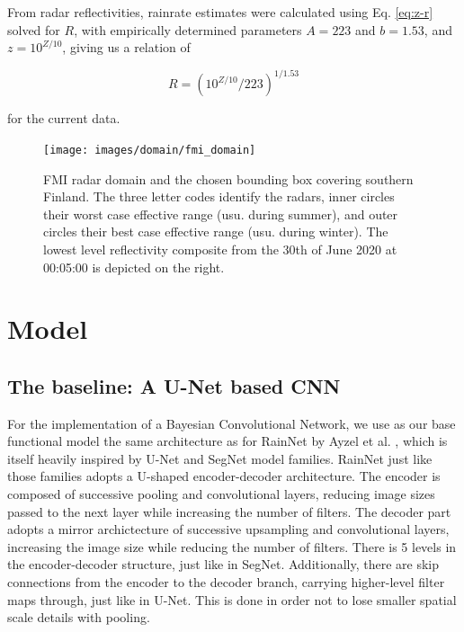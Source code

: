 



From radar reflectivities, rainrate estimates were calculated using Eq. \ref{eq:z-r} solved for $R$, with empirically determined parameters $A=223$ and $b=1.53$, and $z = 10^{Z / 10}$, giving us a relation of

\begin{equation}
\label{eq:dbz_to_r}
R = (10^{Z / 10} / 223)^{1/1.53}
\end{equation}

for the current data. 

\begin{figure}
	\centering
	\texttt{[image: images/domain/fmi\_domain]}
	\caption{FMI radar domain and the chosen bounding box covering southern Finland. The three letter codes identify the radars, inner circles their worst case effective range (usu. during summer), and outer circles their best case effective range (usu. during winter). The lowest level reflectivity composite from the 30th of June 2020 at 00:05:00 is depicted on the right.}
	\label{fig:domain}
\end{figure} 


\section{Model}

\subsection{The baseline: A U-Net based CNN}
\label{section:rainnet}

For the implementation of a Bayesian Convolutional Network, we use as our base functional model  the same architecture as for RainNet by Ayzel et al. \cite{ayzel_rainnet_nodate}, which is itself heavily inspired by U-Net and SegNet model families. RainNet just like those families adopts a U-shaped encoder-decoder architecture. The encoder is composed of successive pooling and convolutional layers, reducing image sizes passed to the next layer while increasing the number of filters. The decoder part adopts a mirror archictecture of successive upsampling and convolutional layers, increasing the image size while reducing the number of filters. There is 5 levels in the encoder-decoder structure, just like in SegNet. Additionally, there are skip connections from the encoder to the decoder branch, carrying higher-level filter maps through, just like in U-Net. This is done in order not to lose smaller spatial scale details with pooling.  

